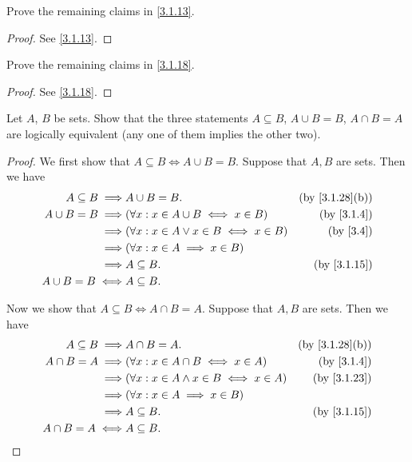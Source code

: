 \begin{ex}\label{ex:3.1.3}
  Prove the remaining claims in \cref{3.1.13}.
\end{ex}

\begin{proof}
  See \cref{3.1.13}.
\end{proof}

\begin{ex}\label{ex:3.1.4}
  Prove the remaining claims in \cref{3.1.18}.
\end{ex}

\begin{proof}
  See \cref{3.1.18}.
\end{proof}

\begin{ex}\label{ex:3.1.5}
  Let \(A\), \(B\) be sets.
  Show that the three statements \(A \subseteq B\), \(A \cup B = B\), \(A \cap B = A\) are logically equivalent (any one of them implies the other two).
\end{ex}

\begin{proof}
  We first show that \(A \subseteq B \iff A \cup B = B\).
  Suppose that \(A, B\) are sets.
  Then we have
  \begin{align*}
    A \subseteq B \implies & A \cup B = B.                                   & \text{(by \cref{3.1.28}(b))} \\
    A \cup B = B \implies  & (\forall x : x \in A \cup B \iff x \in B)       & \text{(by \cref{3.1.4})}     \\
    \implies               & (\forall x : x \in A \lor x \in B \iff x \in B) & \text{(by \cref{3.4})}       \\
    \implies               & (\forall x : x \in A \implies x \in B)                                         \\
    \implies               & A \subseteq B.                                  & \text{(by \cref{3.1.15})}    \\
    A \cup B = B \iff      & A \subseteq B.
  \end{align*}

  Now we show that \(A \subseteq B \iff A \cap B = A\).
  Suppose that \(A, B\) are sets.
  Then we have
  \begin{align*}
    A \subseteq B \implies & A \cap B = A.                                    & \text{(by \cref{3.1.28}(b))} \\
    A \cap B = A \implies  & (\forall x : x \in A \cap B \iff x \in A)        & \text{(by \cref{3.1.4})}     \\
    \implies               & (\forall x : x \in A \land x \in B \iff x \in A) & \text{(by \cref{3.1.23})}    \\
    \implies               & (\forall x : x \in A \implies x \in B)                                          \\
    \implies               & A \subseteq B.                                   & \text{(by \cref{3.1.15})}    \\
    A \cap B = A \iff      & A \subseteq B.
  \end{align*}
\end{proof}

